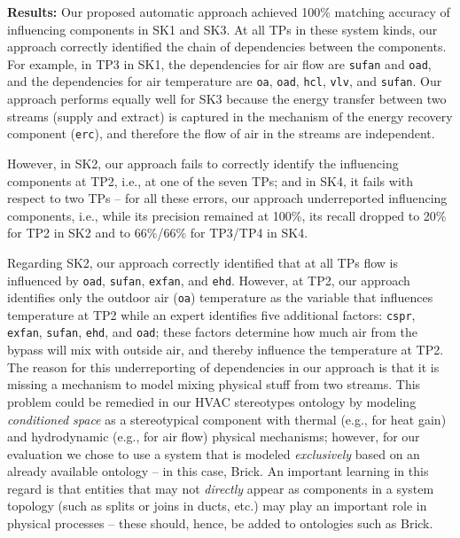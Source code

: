 \documentclass[sigconf]{acmart}
\begin{document}
\textbf{Results:}
Our proposed automatic approach achieved 100\% matching accuracy of influencing components in SK1 and SK3. 
At all TPs in these system kinds, our approach correctly identified the chain of dependencies between the components. For example, in TP3 in SK1, the dependencies for air flow are \texttt{sufan} and \texttt{oad}, and the dependencies for air temperature are \texttt{oa}, \texttt{oad}, \texttt{hcl}, \texttt{vlv}, and \texttt{sufan}.
Our approach performs equally well for SK3 because the energy transfer between two streams (supply and extract) is captured in the mechanism of the energy recovery component (\texttt{erc}), and therefore the flow of air in the streams are independent.

However, in SK2, our approach fails to correctly identify the influencing components at TP2, i.e., at one of the seven TPs; and in SK4, it fails with respect to two TPs -- for all these errors, our approach underreported influencing components, i.e., while its precision remained at 100\%, its recall dropped to 20\% for TP2 in SK2 and to 66\%/66\% for TP3/TP4 in SK4.

Regarding SK2, our approach correctly identified that at all TPs flow is influenced by \texttt{oad}, \texttt{sufan}, \texttt{exfan}, and \texttt{ehd}. However, at TP2, our approach identifies only the outdoor air (\texttt{oa}) temperature as the variable that influences temperature at TP2 while an expert identifies five additional factors: \texttt{cspr}, \texttt{exfan}, \texttt{sufan}, \texttt{ehd}, and \texttt{oad}; these factors determine how much air from the bypass will mix with outside air, and thereby influence the temperature at TP2.
%
The reason for this underreporting of dependencies in our approach is that it is missing a mechanism to model mixing physical stuff from two streams.
This problem could be remedied in our HVAC stereotypes ontology by modeling \emph{conditioned space} as a stereotypical component with thermal (e.g., for heat gain) and hydrodynamic (e.g., for air flow) physical mechanisms; however, for our evaluation we chose to use a system that is modeled \emph{exclusively} based on an already available ontology -- in this case, Brick.
An important learning in this regard is that entities that may not \emph{directly} appear as components in a system topology (such as splits or joins in ducts, etc.) may play an important role in physical processes -- these should, hence, be added to ontologies such as Brick.
\end{document}

